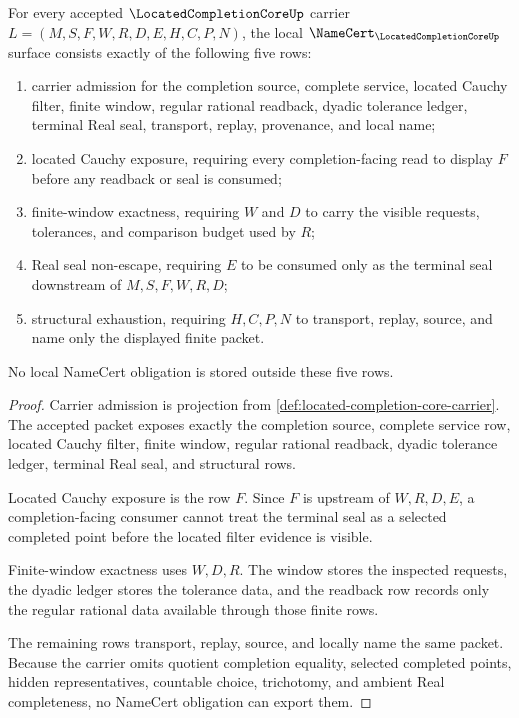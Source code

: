 \begin{theorem}
\label{thm:located-completion-core-namecert-obligations}
For every accepted $\LocatedCompletionCoreUp$ carrier $L=(M,S,F,W,R,D,E,H,C,P,N)$, the local $\NameCert_{\LocatedCompletionCoreUp}$ surface consists exactly of the following five rows:
\begin{enumerate}
\item carrier admission for the completion source, complete service, located Cauchy filter, finite window, regular rational readback, dyadic tolerance ledger, terminal Real seal, transport, replay, provenance, and local name;
\item located Cauchy exposure, requiring every completion-facing read to display $F$ before any readback or seal is consumed;
\item finite-window exactness, requiring $W$ and $D$ to carry the visible requests, tolerances, and comparison budget used by $R$;
\item Real seal non-escape, requiring $E$ to be consumed only as the terminal seal downstream of $M,S,F,W,R,D$;
\item structural exhaustion, requiring $H,C,P,N$ to transport, replay, source, and name only the displayed finite packet.
\end{enumerate}
No local NameCert obligation is stored outside these five rows.
\end{theorem}
\begin{proof}
Carrier admission is projection from \autoref{def:located-completion-core-carrier}. The accepted packet exposes exactly the completion source, complete service row, located Cauchy filter, finite window, regular rational readback, dyadic tolerance ledger, terminal Real seal, and structural rows.

Located Cauchy exposure is the row $F$. Since $F$ is upstream of $W,R,D,E$, a completion-facing consumer cannot treat the terminal seal as a selected completed point before the located filter evidence is visible.

Finite-window exactness uses $W,D,R$. The window stores the inspected requests, the dyadic ledger stores the tolerance data, and the readback row records only the regular rational data available through those finite rows.

The remaining rows transport, replay, source, and locally name the same packet. Because the carrier omits quotient completion equality, selected completed points, hidden representatives, countable choice, trichotomy, and ambient Real completeness, no NameCert obligation can export them.
\end{proof}

